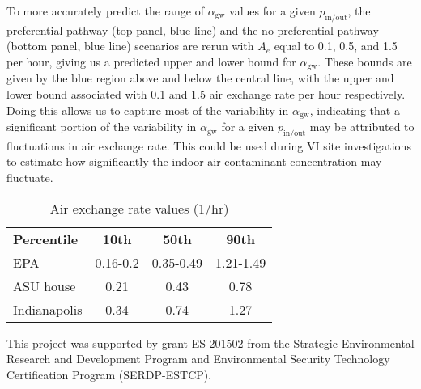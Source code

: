 \documentclass[journal=esthag,manuscript=article]{achemso}
\begin{document}
To more accurately predict the range of $\alpha_\mathrm{gw}$ values for a given $p_\mathrm{in/out}$, the preferential pathway (top panel, blue line) and the no preferential pathway (bottom panel, blue line) scenarios are rerun with $A_e$ equal to 0.1, 0.5, and 1.5 per hour, giving us a predicted upper and lower bound for $\alpha_\mathrm{gw}$.
These bounds are given by the blue region above and below the central line, with the upper and lower bound associated with 0.1 and 1.5 air exchange rate per hour respectively.
Doing this allows us to capture most of the variability in $\alpha_\mathrm{gw}$, indicating that a significant portion of the variability in $\alpha_\mathrm{gw}$ for a given $p_\mathrm{in/out}$ may be attributed to fluctuations in air exchange rate.
This could be used during VI site investigations to estimate how significantly the indoor air contaminant concentration may fluctuate.

\begin{table}[htb!]
  \caption{Air exchange rate values (1/hr)}\label{tbl:air_exchange_rate}
  \begin{tabular}{l c c c}
    \toprule
    \textbf{Percentile} & \textbf{10th} & \textbf{50th} & \textbf{90th} \\
    EPA\cite{u.s._epa_exposure_2011,m._d._koontz_estimation_1995} & 0.16-0.2 & 0.35-0.49 & 1.21-1.49 \\
    ASU house\cite{holton_temporal_2013,guo_identification_2015} & 0.21 & 0.43 & 0.78 \\
    Indianapolis\cite{u.s._environmental_protection_agency_assessment_2015} & 0.34 & 0.74 & 1.27 \\
    \bottomrule
  \end{tabular}
\end{table}

\begin{acknowledgement}
  This project was supported by grant ES-201502 from the Strategic Environmental Research and Development Program and Environmental Security Technology Certification Program (SERDP-ESTCP).
\end{acknowledgement}


\end{document}
